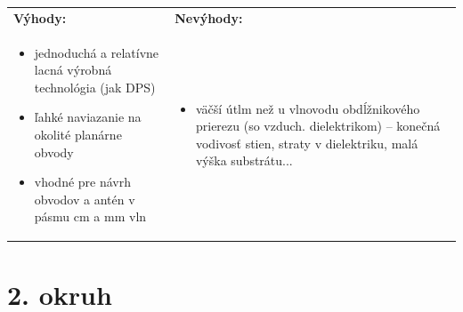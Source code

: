 \begin{tabular}{p{8cm} p{8cm}}
	
	\textbf{Výhody:} & \textbf{Nevýhody:} \\
	
	\begin{minipage}[t]{8cm}
		\begin{itemize}[label=$\oplus$]
			\item jednoduchá a relatívne lacná výrobná technológia (jak DPS)
			\item ľahké naviazanie na okolité planárne obvody
			\item vhodné pre návrh obvodov a antén v pásmu cm a mm vln
		\end{itemize}
	\end{minipage}
	&
	\begin{minipage}[t]{8cm}
		\begin{itemize}[label=$\ominus$]
			\item väčší útlm než u vlnovodu obdĺžnikového prierezu (so vzduch. dielektrikom) -- konečná vodivosť stien, straty v dielektriku, malá výška substrátu...
		\end{itemize}
	\end{minipage}
\end{tabular}

\section{2. okruh}
	
